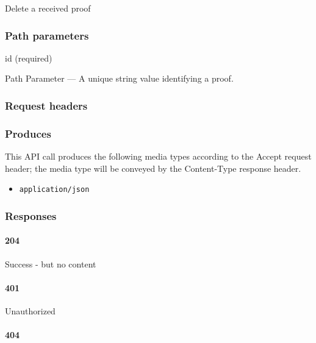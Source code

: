 Delete a received proof

\hypertarget{path-parameters-49}{%
\subsubsection{Path parameters}\label{path-parameters-49}}

id (required)

{Path Parameter} --- A unique string value identifying a proof.

\hypertarget{request-headers-51}{%
\subsubsection{Request headers}\label{request-headers-51}}

\hypertarget{produces-95}{%
\subsubsection{Produces}\label{produces-95}}

This API call produces the following media types according to the
{Accept} request header; the media type will be conveyed by the
{Content-Type} response header.

\begin{itemize}
\tightlist
\item
  \texttt{application/json}
\end{itemize}

\hypertarget{responses-97}{%
\subsubsection{Responses}\label{responses-97}}

\hypertarget{section-318}{%
\paragraph{204}\label{section-318}}

Success - but no content \protect\hyperlink{}{}

\hypertarget{section-319}{%
\paragraph{401}\label{section-319}}

Unauthorized \protect\hyperlink{}{}

\hypertarget{section-320}{%
\paragraph{404}\label{section-320}}

